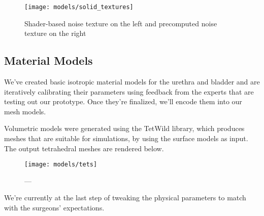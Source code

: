 \begin{figure}
  \centering
  \texttt{[image: models/solid\_textures]}
  \caption{Shader-based noise texture on the left and precomputed noise texture on the right}\label{fig:solid_textures}
 \end{figure}

\subsection{Material Models}
We've created basic isotropic material models for the urethra and bladder and are iteratively calibrating their parameters using feedback from the experts that are testing out our prototype. Once they're finalized, we'll encode them into our mesh models.

Volumetric models were generated using the TetWild library, which produces meshes that are suitable for  simulations, by using the surface models as input. The output tetrahedral meshes are rendered below.

\begin{figure}
  \centering%
  \texttt{[image: models/tets]}
  \caption{---}\label{fig:tetra_meshes}
\end{figure}

We're currently at the last step of tweaking the physical parameters to match with the surgeons' expectations.

\clearpage%

